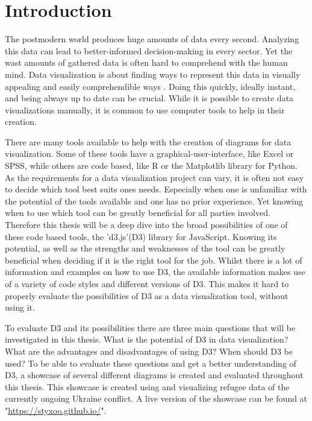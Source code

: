 \chapter{Introduction}

The postmodern world produces huge amounts of data every second. Analyzing this data can lead to better-informed decision-making in every sector. Yet the wast amounts of gathered data is often hard to comprehend with the human mind. Data visualization is about finding ways to represent this data in visually appealing and easily comprehendible ways \cite{sadiku2016data}. Doing this quickly, ideally instant, and being always up to date can be crucial. While it is possible to create data visualizations manually, it is common to use computer tools to help in their creation.

There are many tools available to help with the creation of diagrams for data visualization. Some of these tools have a graphical-user-interface, like Excel \cite{excel} or SPSS\cite{spss}, while others are code based, like R \cite{r} or the Matplotlib \cite{matplotlib} library for Python. As the requirements for a data visualization project can vary, it is often not easy to decide which tool best suits ones needs. Especially when one is unfamiliar with the potential of the tools available and one has no prior experience. Yet knowing when to use which tool can be greatly beneficial for all parties involved. Therefore this thesis will be a deep dive into the broad possibilities of one of these code based tools, the 'd3.js'(D3) library for JavaScript. Knowing its potential, as well as the strengths and weaknesses of the tool can be greatly beneficial when deciding if it is the right tool for the job. Whilst there is a lot of information and examples on how to use D3, the available information makes use of a variety of code styles and different versions of D3. This makes it hard to properly evaluate the possibilities of D3 as a data visualization tool, without using it.

To evaluate D3 and its possibilities there are three main questions that will be investigated in this thesis. What is the potential of D3 in data visualization? What are the advantages and disadvantages of using D3? When should D3 be used? To be able to evaluate these questions and get a better understanding of D3, a showcase of several different diagrams is created and evaluated throughout this thesis. This showcase is created using and visualizing refugee data of the currently ongoing Ukraine conflict. A live version of the showcase can be found at "\url{https://styxoo.github.io/}".

